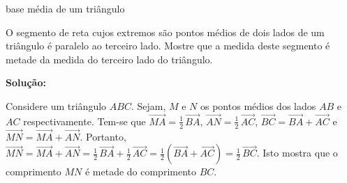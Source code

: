 \begin{example}{ base média de um triângulo}

O segmento de reta cujos extremos são pontos médios de dois lados de um triângulo é paralelo ao terceiro lado. Mostre que a medida deste segmento é metade da medida do terceiro lado do triângulo.

\textbf{Solução:}

Considere um triângulo \(ABC\). Sejam, \(M\) e \(N\) os pontos médios dos lados \(AB\) e \(AC\) respectivamente. Tem-se que \(\overrightarrow{MA} = \frac{1}{2} \, \overrightarrow{BA}\), \(\overrightarrow{AN} = \frac{1}{2} \, \overrightarrow{AC}\),
\(\overrightarrow{BC} = \overrightarrow{BA} + \overrightarrow{AC}\) e \(\overrightarrow{MN} = \overrightarrow{MA} + \overrightarrow{AN}\). Portanto, \(\overrightarrow{MN} = \overrightarrow{MA} + \overrightarrow{AN} =
\frac{1}{2} \, \overrightarrow{BA} + \frac{1}{2} \, \overrightarrow{AC} = \frac{1}{2} \left(\overrightarrow{BA} + \overrightarrow{AC}\right) = \frac{1}{2} \, \overrightarrow{BC}\).
Isto mostra que o comprimento \(MN\) é metade do comprimento \(BC\).

\begin{center}
\end{center}
\end{example}

